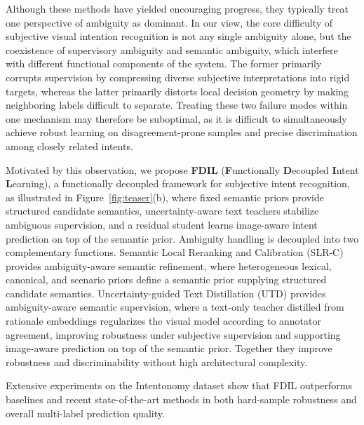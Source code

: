 Although these methods have yielded encouraging progress, they typically treat one perspective of ambiguity as dominant. 
In our view, the core difficulty of subjective visual intention recognition is not any single ambiguity alone, but the coexistence of supervisory ambiguity and semantic ambiguity, which interfere with different functional components of the system. 
The former primarily corrupts supervision by compressing diverse subjective interpretations into rigid targets, whereas the latter primarily distorts local decision geometry by making neighboring labels difficult to separate. 
Treating these two failure modes within one mechanism may therefore be suboptimal, as it is difficult to simultaneously achieve robust learning on disagreement-prone samples and precise discrimination among closely related intents.

Motivated by this observation, we propose \textbf{FDIL} (\textbf{F}unctionally \textbf{D}ecoupled \textbf{I}ntent \textbf{L}earning), a functionally decoupled framework for subjective intent recognition, as illustrated in Figure~\ref{fig:teaser}(b), where fixed semantic priors provide structured candidate semantics, uncertainty-aware text teachers stabilize ambiguous supervision, and a residual student learns image-aware intent prediction on top of the semantic prior.
Ambiguity handling is decoupled into two complementary functions. Semantic Local Reranking and Calibration (SLR-C) provides ambiguity-aware semantic refinement, where heterogeneous lexical, canonical, and scenario priors define a semantic prior supplying structured candidate semantics. Uncertainty-guided Text Distillation (UTD) provides ambiguity-aware semantic supervision, where a text-only teacher distilled from rationale embeddings regularizes the visual model according to annotator agreement, improving robustness under subjective supervision and supporting image-aware prediction on top of the semantic prior. Together they improve robustness and discriminability without high architectural complexity.

Extensive experiments on the Intentonomy dataset show that FDIL outperforms baselines and recent state-of-the-art methods in both hard-sample robustness and overall multi-label prediction quality.

